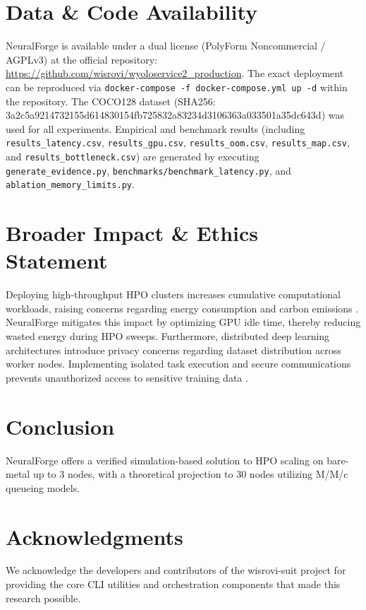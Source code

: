 \documentclass[conference]{IEEEtran}
\begin{document}
\section{Data \& Code Availability}
NeuralForge is available under a dual license (PolyForm Noncommercial / AGPLv3) at the official repository: \url{https://github.com/wisrovi/wyoloservice2_production}. The exact deployment can be reproduced via \texttt{docker-compose -f docker-compose.yml up -d} within the repository. The COCO128 dataset \cite{lin2014microsoft} (SHA256: 3a2c5a9214732155d614830154fb725832a83234d3106363a033501a35dc643d) was used for all experiments. Empirical and benchmark results (including \texttt{results\_latency.csv}, \texttt{results\_gpu.csv}, \texttt{results\_oom.csv}, \texttt{results\_map.csv}, and \texttt{results\_bottleneck.csv}) are generated by executing \texttt{generate\_evidence.py}, \texttt{benchmarks/benchmark\_latency.py}, and \texttt{ablation\_memory\_limits.py}.



\section{Broader Impact \& Ethics Statement}
Deploying high-throughput HPO clusters increases cumulative computational workloads, raising concerns regarding energy consumption and carbon emissions \cite{patterson2021carbon}. NeuralForge mitigates this impact by optimizing GPU idle time, thereby reducing wasted energy during HPO sweeps. Furthermore, distributed deep learning architectures introduce privacy concerns regarding dataset distribution across worker nodes. Implementing isolated task execution and secure communications prevents unauthorized access to sensitive training data \cite{shokri2015privacy}.

\section{Conclusion}
NeuralForge offers a verified simulation-based solution to HPO scaling on bare-metal up to 3 nodes, with a theoretical projection to 30 nodes utilizing M/M/c queueing models.

\section*{Acknowledgments}
We acknowledge the developers and contributors of the wisrovi-suit project for providing the core CLI utilities and orchestration components that made this research possible.



\end{document}
